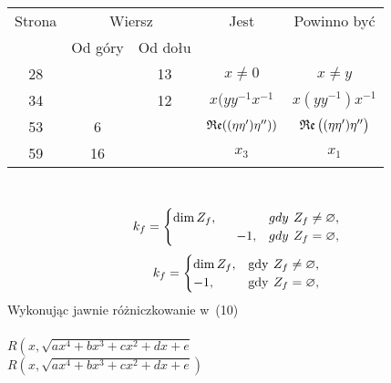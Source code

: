 \documentclass[a4paper,11pt]{article}
\numberwithin{equation}{section}
\begin{document}


\begin{center}

  \begin{tabular}{|c|c|c|c|c|}
    \hline
    Strona & \multicolumn{2}{c|}{Wiersz} & Jest
                              & Powinno być \\ \cline{2-3}
    & Od góry & Od dołu & & \\
    \hline
    28  & & 13 & $x \neq 0$ & $x \neq y$ \\
    34  & & 12 & $x ( y y^{ -1 } x^{ -1 }$ & $x ( y y^{ -1 } ) x^{ -1 }$ \\
    53  &  6 & & $\operatorname{\mathfrak{Re}}( ( \eta \eta' ) \eta'' ) )$
           & $\operatorname{\mathfrak{Re}}\big( ( \eta \eta' ) \eta'' \big)$ \\
    59  & 16 & & $x_{ 3 }$ & $x_{ 1 }$ \\
    \hline
  \end{tabular}

\end{center}

\VerSpaceTwo


\noindent
{} \\
\Jest
\begin{equation*}
  k_{ f } =
  \begin{cases}
    \dim Z_{ f }, & gdy\:\, Z_{ f } \neq \oldemptyset, \\
    \quad \quad \quad \quad \quad -1, & gdy\:\, Z_{ f } = \oldemptyset,
  \end{cases}
\end{equation*}
\PowinnoByc
\begin{equation*}
  k_{ f }
  =
  \begin{cases}
    \dim Z_{ f }, & \textrm{gdy}\:\, Z_{ f } \neq \oldemptyset, \\
    -1, & \textrm{gdy}\:\, Z_{ f } = \oldemptyset,
  \end{cases}
\end{equation*}
\PowinnoByc  Wykonując jawnie różniczkowanie w~(10) \\
 \\
\Jest
$R\left( x, \sqrt{ a x^{ 4 } + b x^{ 3 } + c x^{ 2 } + d x + e }
\right.$ \\
\PowinnoByc
$R\left( x, \sqrt{ a x^{ 4 } + b x^{ 3 } + c x^{ 2 } + d x + e }
\right)$ \\
\end{document}
